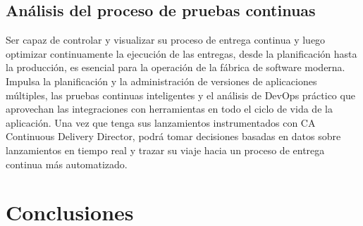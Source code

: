 \documentclass[preprint,12pt]{elsarticle}
\begin{document}
\subsection{\textbf{Análisis del proceso de pruebas continuas}}
Ser capaz de controlar y visualizar su proceso de entrega continua y luego optimizar continuamente la ejecución de las entregas, desde la planificación hasta la producción, es esencial para la operación de la fábrica de software moderna. Impulsa la planificación y la administración de versiones de aplicaciones múltiples, las pruebas continuas inteligentes y el análisis de DevOps práctico que aprovechan las integraciones con herramientas en todo el ciclo de vida de la aplicación. Una vez que tenga sus lanzamientos instrumentados con CA Continuous Delivery Director, podrá tomar decisiones basadas en datos sobre lanzamientos en tiempo real y trazar su viaje hacia un proceso de entrega continua más automatizado.




\section{Conclusiones}
\end{document}
